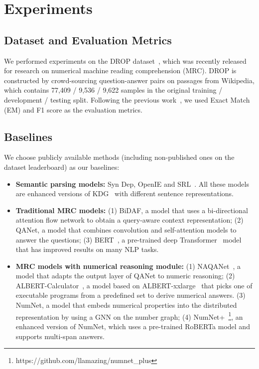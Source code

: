 \documentclass{article}
\begin{document}
\section{Experiments}

\subsection{Dataset and Evaluation Metrics}

We performed experiments on the DROP dataset~\cite{DBLP:conf/naacl/DuaWDSS019}, which was recently released for research on numerical machine reading comprehension (MRC). DROP is constructed by crowd-sourcing question-answer pairs on passages from Wikipedia, which contains 77,409 / 9,536 / 9,622 samples in the original training / development / testing split.
Following the previous work~\cite{DBLP:conf/naacl/DuaWDSS019}, we used Exact Match (EM) and F1 score as the evaluation metrics.

\subsection{Baselines}
We choose publicly available methods (including non-published ones on the dataset leaderboard) as our baselines:
\begin{itemize}[leftmargin=*,nolistsep,nosep]
\setlength\itemsep{0.5em}
    \item \textbf{Semantic parsing models:} Syn Dep, OpenIE and SRL~\cite{DBLP:conf/naacl/DuaWDSS019}. All these models are enhanced versions of KDG~\cite{krishnamurthy-etal-2017-kdg} with different sentence representations.
    \item \textbf{Traditional MRC models:} (1) BiDAF, a model that uses a bi-directional attention flow network to obtain a query-aware context representation; (2) QANet, a model that combines convolution and self-attention models to answer the questions; (3) BERT~\cite{devlin-etal-2019-bert}, a pre-trained deep Transformer~\cite{vaswani2017attention} model that has improved results on many NLP tasks.
    \item \textbf{MRC models with numerical reasoning module:} (1) NAQANet~\cite{DBLP:conf/naacl/DuaWDSS019}, a model that adapts the output layer of QANet to numeric reasoning; (2) ALBERT-Calculator~\cite{DBLP:conf/emnlp/AndorHLP19}, a model based on ALBERT-xxlarge~\cite{DBLP:conf/iclr/LanCGGSS20} that picks one of executable programs from a predefined set to derive numerical answers. (3) NumNet, a model that embeds numerical properties into the distributed representation by using a GNN on the number graph; (4) NumNet+~\footnote{https://github.com/llamazing/numnet\_plus}, an enhanced version of NumNet, which uses a pre-trained RoBERTa model and supports multi-span answers. 
\end{itemize} 
\end{document}
